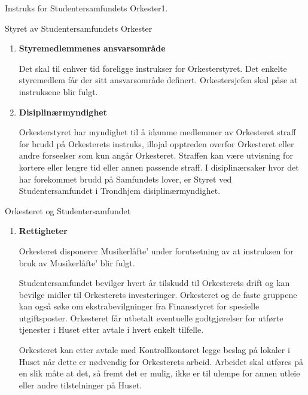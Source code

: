 \begin{instruks}{Instruks for Studentersamfundets Orkester}{1. }{ }
\begin{instruksledd}{Styret av Studentersamfundets Orkester}
\begin{enumerate}
Orkestersjefen, eller den Orkestersjefen bemyndiger, skal innkalle til styremøte når det er
nødvendig,
minimum en gang per uke. Det skal også avholdes styremøte dersom minimum tre styremedlemmer krever
det og kaller inn resten av styret på ordinær måte. I månedene juni, juli, august og desember holdes
det
normalt ikke styremøter.

Ved grov pliktforsømmelse kan styremedlemmer avsettes ved ekstraordinær generalforsamling.

        \item \textbf{Styremedlemmenes ansvarsområde}

Det skal til enhver tid foreligge instrukser for Orkesterstyret. Det enkelte styremedlem får der
sitt
ansvarsområde definert. Orkestersjefen skal påse at instruksene blir fulgt.

        \item \textbf{Disiplinærmyndighet}

Orkesterstyret har myndighet til å idømme medlemmer av Orkesteret straff for brudd på Orkesterets
instruks,
illojal opptreden overfor Orkesteret eller andre forseelser som kun angår Orkesteret. Straffen kan
være
utvisning for kortere eller lengre tid eller annen passende straff. I disiplinærsaker hvor det har
forekommet
brudd på Samfundets lover, er Styret ved Studentersamfundet i Trondhjem disiplinærmyndighet.

    \end{enumerate}
\end{instruksledd}

\begin{instruksledd}{Orkesteret og Studentersamfundet}
    \begin{enumerate}

        \item \textbf{Rettigheter}

Orkesteret disponerer Musikerlåfte' under forutsetning av at instruksen for bruk av Musikerlåfte'
blir fulgt.

Studentersamfundet bevilger hvert år tilskudd til Orkesterets drift og kan bevilge midler til
Orkesterets
investeringer. Orkesteret og de faste gruppene kan også søke om ekstrabevilgninger fra Finansstyret
for
spesielle utgiftsposter. Orkesteret får utbetalt eventuelle godtgjørelser for utførte tjenester i
Huset etter avtale
i hvert enkelt tilfelle.

Orkesteret kan etter avtale med Kontrollkontoret legge beslag på lokaler i Huset når dette er
nødvendig for
Orkesterets arbeid. Arbeidet skal utføres på en slik måte at det, så fremt det er mulig, ikke er til
ulempe for
annen utleie eller andre tilstelninger på Huset.


\end{enumerate}
\end{instruksledd}
\end{instruks}

